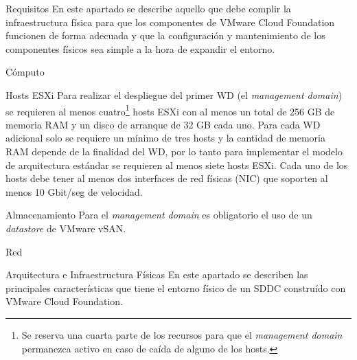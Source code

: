 \begin{section}{Requisitos}
En este apartado se describe aquello que debe complir la infraestructura física para que los componentes de VMware Cloud Foundation funcionen de forma adecuada y que la configuración y mantenimiento de los componentes físicos sea simple a la hora de expandir el entorno.

\begin{subsection}{Cómputo}
\begin{subsubsection}{Hosts ESXi}
    Para realizar el despliegue del primer WD (el \textit{management domain}) se requieren al menos cuatro\footnote{Se reserva una cuarta parte de los recursos para que el \textit{management domain} permanezca activo en caso de caída de alguno de los hosts.} hosts ESXi con al menos un total de 256 GB de memoria RAM y un disco de arranque de 32 GB cada uno. Para cada WD adicional solo se requiere un mínimo de tres hosts y la cantidad de memoria RAM depende de la finalidad del WD, por lo tanto para implementar el modelo de arquitectura estándar se requieren al menos siete hosts ESXi. Cada uno de los hosts debe tener al menos dos interfaces de red físicas (NIC) que soporten al menos 10 Gbit/seg de velocidad.
    
\end{subsubsection}
\end{subsection}
\begin{subsection}{Almacenamiento}
    Para el \textit{management domain} es obligatorio el uso de un \textit{datastore} de VMware vSAN.
\end{subsection}
\begin{subsection}{Red}
    
\end{subsection}
\begin{subsection}{Arquitectura e Infraestructura Físicas \cite{CFfisInfraestuctura}}
    En este apartado se describen las principales características que tiene el entorno físico de un SDDC construído con VMware Cloud Foundation.



\end{subsection}
\end{section}
